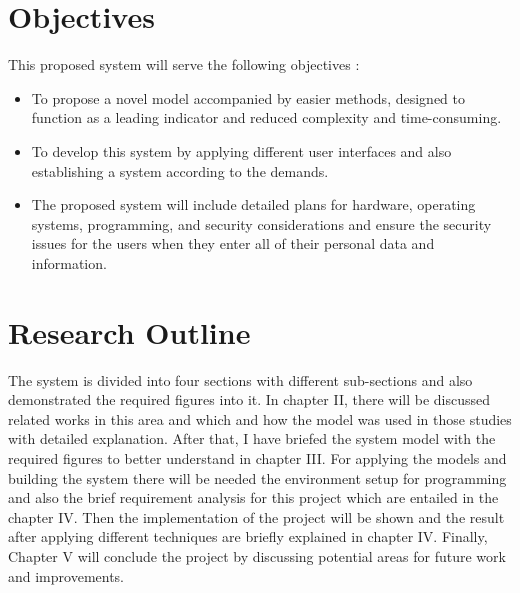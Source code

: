 \section{Objectives} 
This proposed system will serve the following objectives :
\begin{itemize}
    \item	To propose a novel model accompanied by easier methods, designed to function as a leading indicator and reduced complexity and time-consuming.


    \item	To develop this system by applying different user interfaces and also establishing a system according to the demands.

    \item	The proposed system will include detailed plans for hardware, operating systems, programming, and security considerations and  ensure the security issues for the users when they enter all of their personal data and information.







\end{itemize}

\section{Research Outline}
The system is divided into four sections with different sub-sections and also demonstrated the required figures into it. In chapter II, there will be discussed related works in this area and which and how the model was used in those studies with detailed explanation. After that, I have briefed  the system model with the required figures to better understand in chapter III. For applying the models and building the system there will be needed the environment setup for programming and also the brief requirement analysis for this project which are entailed in the chapter IV. Then the implementation of the project will be shown and the result after applying different techniques are briefly explained in chapter IV. Finally, Chapter V will conclude the project by discussing potential areas for future work and improvements.






